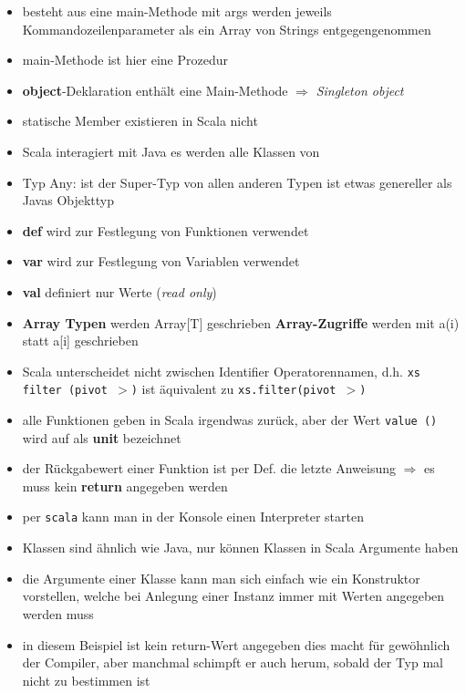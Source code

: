 \begin{itemize}
  \item besteht aus eine main-Methode \und mit args werden jeweils 
  Kommandozeilenparameter als ein Array von Strings entgegengenommen
  \item main-Methode ist hier eine Prozedur
  \item \textbf{object}-Deklaration enthält eine Main-Methode $\Rightarrow$ 
  \textit{Singleton object}
  \item statische Member existieren in Scala nicht
  \item Scala interagiert mit Java \und es werden alle Klassen von
  \item Typ Any: ist der Super-Typ von allen anderen Typen \und ist etwas
  genereller als Javas Objekttyp
  \item \textbf{def} wird zur Festlegung von Funktionen verwendet
  \item \textbf{var} wird zur Festlegung von Variablen verwendet
  \item \textbf{val} definiert nur Werte (\textit{read only})
  \item \textbf{Array Typen} werden Array[T] geschrieben \und \textbf{Array-Zugriffe} werden
  mit a(i) statt a[i] geschrieben
  \item Scala unterscheidet nicht zwischen Identifier \und Operatorennamen,
  d.h. \texttt{xs filter (pivot $>$)} ist äquivalent zu 
  \texttt{xs.filter(pivot $>$)}
  \item alle Funktionen geben in Scala irgendwas zurück, aber der Wert
  \texttt{value ()} wird auf als \textbf{unit} bezeichnet
  \item der Rückgabewert einer Funktion ist per Def. die letzte Anweisung
  $\Rightarrow$ es muss kein \textbf{return} angegeben werden
  \item per \texttt{scala} kann man in der Konsole einen Interpreter starten
  \item Klassen sind ähnlich wie Java, nur können Klassen in Scala Argumente 
  haben
  \item die Argumente einer Klasse kann man sich einfach wie ein Konstruktor
  vorstellen, welche bei Anlegung einer Instanz immer mit Werten angegeben 
  werden muss
  
  
  
  \item in diesem Beispiel ist kein return-Wert angegeben \und dies macht
  für gewöhnlich der Compiler, aber manchmal schimpft er auch herum, sobald
  der Typ mal nicht zu bestimmen ist
  
\end{itemize}


